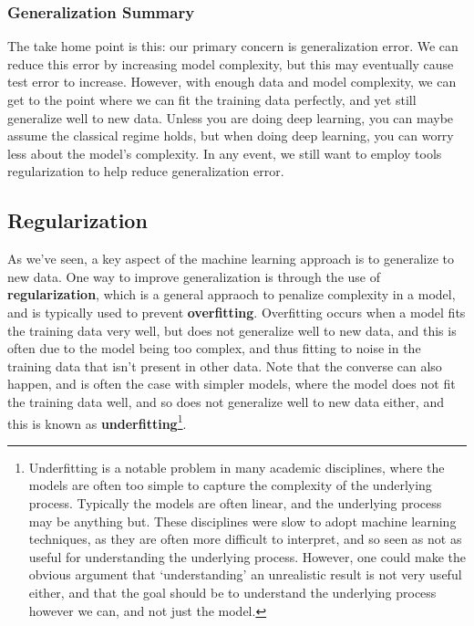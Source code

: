 \documentclass[
  letterpaper,
]{krantz}
\begin{document}
\subsubsection{Generalization Summary}\label{generalization-summary}

The take home point is this: our primary concern is generalization
error. We can reduce this error by increasing model complexity, but this
may eventually cause test error to increase. However, with enough data
and model complexity, we can get to the point where we can fit the
training data perfectly, and yet still generalize well to new data.
Unless you are doing deep learning, you can maybe assume the classical
regime holds, but when doing deep learning, you can worry less about the
model's complexity. In any event, we still want to employ tools
regularization to help reduce generalization error.

\subsection{Regularization}\label{regularization}

As we've seen, a key aspect of the machine learning approach is to
generalize to new data. One way to improve generalization is through the
use of \textbf{regularization}, which is a general appraoch to penalize
complexity in a model, and is typically used to prevent
\textbf{overfitting}. Overfitting occurs when a model fits the training
data very well, but does not generalize well to new data, and this is
often due to the model being too complex, and thus fitting to noise in
the training data that isn't present in other data. Note that the
converse can also happen, and is often the case with simpler models,
where the model does not fit the training data well, and so does not
generalize well to new data either, and this is known as
\textbf{underfitting}\footnote{Underfitting is a notable problem in many
  academic disciplines, where the models are often too simple to capture
  the complexity of the underlying process. Typically the models are
  often linear, and the underlying process may be anything but. These
  disciplines were slow to adopt machine learning techniques, as they
  are often more difficult to interpret, and so seen as not as useful
  for understanding the underlying process. However, one could make the
  obvious argument that `understanding' an unrealistic result is not
  very useful either, and that the goal should be to understand the
  underlying process however we can, and not just the model.}.
\end{document}
